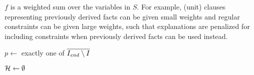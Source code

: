 %
$f$ is a weighted sum over the variables in $S$. For example, (unit) clauses representing previously derived facts can be given small weights and regular constraints can be given large weights, such that explanations are penalized for including constraints when previously derived facts can be used instead. %
\newcommand\onestepo{\ensuremath{\call{explain-One-Step-ocus}}\xspace}
\begin{algorithm}[t]
  \DontPrintSemicolon
  
  \caption{$\onestepo(\formulac,f,I,\Iend)$}
  \label{alg:oneStepOCUS}
  $p \leftarrow$ exactly one of $\overline{I_\mathit{end} \setminus I}$\;
\end{algorithm}
\begin{algorithm}[t]
  \DontPrintSemicolon
  $\mathcal{H}  \gets \emptyset$ \; %
  \caption{$\comus(\formula,f,p)$ }
  \label{alg:comus}
\end{algorithm}


